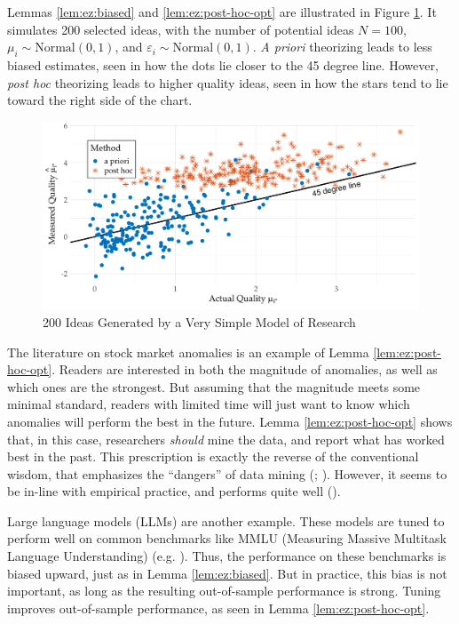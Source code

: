 \documentclass[12pt,english]{article}
\theoremstyle{plain}
\theoremstyle{plain}
\begin{document}
Lemmas \ref{lem:ez:biased} and \ref{lem:ez:post-hoc-opt} are illustrated in Figure \ref{fig:ez}. It simulates 200 selected ideas, with the number of potential ideas $N=100$, $\mu_i \sim \text{Normal}\left(0, 1\right)$, and $\varepsilon_i \sim \text{Normal}\left(0, 1\right)$. \emph{A priori} theorizing leads to less biased estimates, seen in how the dots lie closer to the 45 degree line. However, \emph{post hoc} theorizing leads to higher quality ideas, seen  in how the stars tend to lie toward the right side of the chart.

\begin{figure}[htbp]
    \centering
    \includegraphics[width=\textwidth]{exhibits/simple-scatter.pdf}
    \caption{200 Ideas Generated by a Very Simple Model of Research}
    \label{fig:ez}
\end{figure}


The literature on stock market anomalies is an example of Lemma \ref{lem:ez:post-hoc-opt}. Readers are interested in both the magnitude of anomalies, as well as which ones are the strongest.  But assuming that the magnitude meets some minimal standard, readers with limited time will just want to know which anomalies will perform the best in the future. Lemma \ref{lem:ez:post-hoc-opt} shows that, in this case, researchers \emph{should} mine the data, and report what has worked best in the past. This prescription is exactly the reverse of the conventional wisdom, that emphasizes the ``dangers'' of data mining (\citealt{sullivan1999data}; \citealt{harvey2016and}). However, it seems to be in-line with empirical practice, and performs quite well (\citealt{chen2024does}).

Large language models (LLMs) are another example. These models are tuned to perform well on common benchmarks like MMLU (Measuring Massive Multitask Language Understanding) (e.g. \citet{guo2025deepseek}). Thus, the performance on these benchmarks is biased upward, just as in Lemma \ref{lem:ez:biased}. But in practice, this bias is not important, as long as the resulting out-of-sample performance is strong. Tuning improves out-of-sample performance, as seen in Lemma \ref{lem:ez:post-hoc-opt}. 
\end{document}
